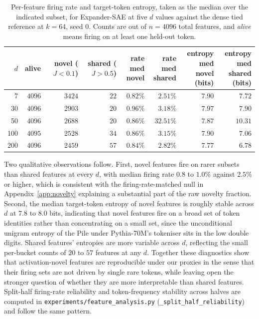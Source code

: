 \documentclass{article}
\theoremstyle{plain}
\theoremstyle{definition}
\theoremstyle{remark}
\begin{document}
\begin{table}[h]
    \centering
    \caption{Per-feature firing rate and target-token entropy, taken as the median over the indicated subset, for Expander-SAE at five $d$ values against the dense tied reference at $k{=}64$, seed 0. Counts are out of $n{=}4096$ total features, and \emph{alive} means firing on at least one held-out token.}
    \label{tab:appD_feature_stats}
    \small
    \begin{tabular}{rrrrrrrr}
        \toprule
        $d$ & alive & novel ($J{<}0.1$) & shared ($J{>}0.5$) & \shortstack{rate med\\novel} & \shortstack{rate med\\shared} & \shortstack{entropy med\\novel (bits)} & \shortstack{entropy med\\shared (bits)} \\
        \midrule
          7 & $4096$ & $3424$ & $22$ & $0.82\%$ & $2.51\%$ & $7.90$ & $7.72$ \\
         30 & $4096$ & $2903$ & $20$ & $0.96\%$ & $3.18\%$ & $7.97$ & $7.90$ \\
         50 & $4096$ & $2688$ & $20$ & $0.86\%$ & $32.51\%$ & $7.87$ & $10.31$ \\
        100 & $4095$ & $2528$ & $34$ & $0.86\%$ & $3.15\%$ & $7.90$ & $7.06$ \\
        200 & $4096$ & $2459$ & $57$ & $0.84\%$ & $2.82\%$ & $7.77$ & $6.78$ \\
        \bottomrule
    \end{tabular}
\end{table}

Two qualitative observations follow. First, novel features fire on rarer subsets than shared features at every $d$, with median firing rate $0.8$ to $1.0\%$ against $2.5\%$ or higher, which is consistent with the firing-rate-matched null in Appendix~\ref{app:novelty} explaining a substantial part of the raw novelty fraction. Second, the median target-token entropy of novel features is roughly stable across $d$ at $7.8$ to $8.0$ bits, indicating that novel features fire on a broad set of token identities rather than concentrating on a small set, since the unconditional unigram entropy of the Pile under Pythia-70M's tokeniser sits in the low double digits. Shared features' entropies are more variable across $d$, reflecting the small per-bucket counts of $20$ to $57$ features at any $d$. Together these diagnostics show that activation-novel features are reproducible under our proxies in the sense that their firing sets are not driven by single rare tokens, while leaving open the stronger question of whether they are more interpretable than shared features. Split-half firing-rate reliability and token-frequency stability across halves are computed in \texttt{experiments/feature\_analysis.py} (\texttt{\_split\_half\_reliability}) and follow the same pattern.
\end{document}
